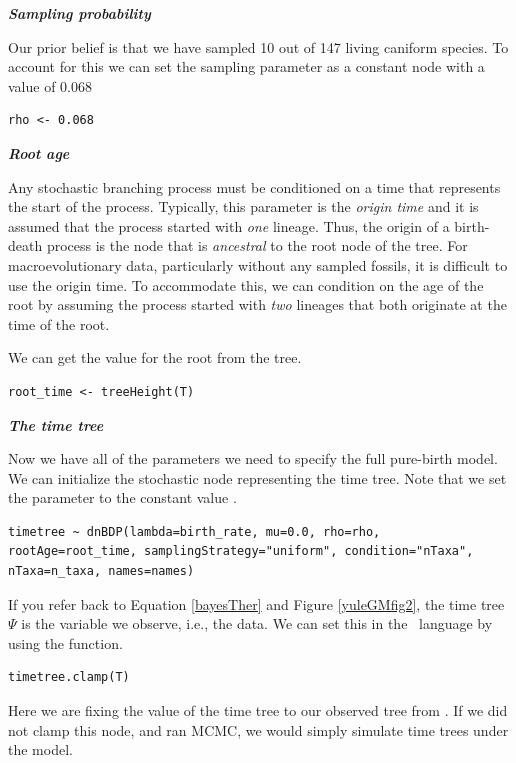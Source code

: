\textbf{\textit{Sampling probability}}

Our prior belief is that we have sampled 10 out of 147 living caniform species. 
To account for this we can set the sampling parameter as a constant node with a value of 0.068
{\tt \begin{snugshade*}
\begin{lstlisting}
rho <- 0.068
\end{lstlisting}
\end{snugshade*}}


\textbf{\textit{Root age}}

Any stochastic branching process must be conditioned on a time that represents the start of the process. 
Typically, this parameter is the \textit{origin time} and it is assumed that the process started with \textit{one} lineage. 
Thus, the origin of a birth-death process is the node that is \textit{ancestral} to the root node of the tree.
For macroevolutionary data, particularly without any sampled fossils, it is difficult to use the origin time.
To accommodate this, we can condition on the age of the root by assuming the process started with \textit{two} lineages that both originate at the time of the root.

We can get the value for the root from the \citet{dosReis2012} tree.

{\tt \begin{snugshade*}
\begin{lstlisting}
root_time <- treeHeight(T)
\end{lstlisting}
\end{snugshade*}}

\textbf{\textit{The time tree}}

Now we have all of the parameters we need to specify the full pure-birth model. 
We can initialize the stochastic node representing the time tree.
Note that we set the  parameter to the constant value .
{\tt \begin{snugshade*}
\begin{lstlisting}
timetree ~ dnBDP(lambda=birth_rate, mu=0.0, rho=rho, rootAge=root_time, samplingStrategy="uniform", condition="nTaxa", nTaxa=n_taxa, names=names)\end{lstlisting}
\end{snugshade*}}

If you refer back to Equation \ref{bayesTher} and Figure \ref{yuleGMfig2}, the time tree $\Psi$ is the variable we observe, i.e., the data. 
We can set this in the \Rev~language by using the  function.
{\tt \begin{snugshade*}
\begin{lstlisting}
timetree.clamp(T)
\end{lstlisting}
\end{snugshade*}}
Here we are fixing the value of the time tree to our observed tree from \citet{dosReis2012}.
If we did not clamp this node, and ran MCMC, we would simply simulate time trees under the model.

